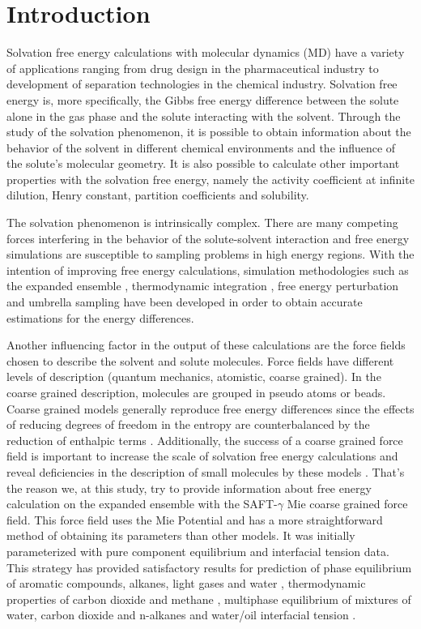 \chapter{Introduction} %
\label{Chapter1} %
\onehalfspacing
Solvation free energy calculations with molecular dynamics (MD) have a variety of applications ranging from drug design in the pharmaceutical industry to development of separation technologies in the chemical industry. Solvation free energy is, more specifically, the Gibbs free energy difference between the solute alone in the gas phase and the solute interacting with the solvent. Through the study of the solvation phenomenon, it is possible to obtain information about the behavior of the solvent in different chemical environments and the influence of the solute's molecular geometry. It is also possible to calculate other important properties with the solvation free energy, namely the activity coefficient at infinite dilution, Henry constant, partition coefficients and solubility. 

The solvation phenomenon is intrinsically complex. There are many competing forces interfering in the behavior of the solute-solvent interaction and free energy simulations are susceptible to sampling problems in high energy regions. With the intention of improving free energy calculations, simulation methodologies such as the expanded ensemble \cite{lyubartsev}, thermodynamic integration \cite{kirkwood1935}, free energy perturbation \cite{zwanzig1954,bennet1976,mbar} and umbrella sampling \cite{TORRIE1977187} have been developed in order to obtain accurate estimations for the energy differences. 

Another influencing factor in the output of these calculations are the force fields chosen to describe the solvent and solute molecules. Force fields have different levels of description (quantum mechanics, atomistic, coarse grained). In the coarse grained description, molecules are grouped in pseudo atoms or beads. Coarse grained models generally reproduce free energy differences since the effects of reducing degrees of freedom in the entropy are counterbalanced by the reduction of enthalpic terms \cite{kmiecik2016}. Additionally, the success of a coarse grained force field is important to increase the scale of solvation free energy calculations and reveal deficiencies in the description of small molecules by these models \cite{mobley2007,shirts2013}. That's the reason we, at this study, try to provide information about free energy calculation on the expanded ensemble with the SAFT-$\gamma$ Mie coarse grained force field. This force field uses the Mie Potential \cite{MIE} and has a more straightforward method of obtaining its parameters than other models. It was initially parameterized with pure component equilibrium and interfacial tension data. This strategy has provided satisfactory results for prediction of phase equilibrium of aromatic compounds, alkanes, light gases and water \cite{herdes2015,muller2017,lobanova2015} , thermodynamic properties of carbon dioxide and methane \cite{cassiano1}, multiphase equilibrium of mixtures of water, carbon dioxide and n-alkanes \cite{lobanova2016} and water/oil interfacial tension \cite{herdes2017}. 

